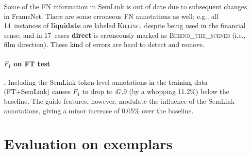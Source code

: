 \documentclass[a4paper,11pt,titlepage]{article}
\newcommand{\fnf}[1]{\textsc{\textsf{#1}}} %
\newcommand{\vpred}[1]{\textbf{#1}} %
\begin{document}
Some of the FN information in SemLink is out of date due to subsequent changes in FrameNet.
There are some erroneous FN annotations as well: e.g., all 14~instances of \vpred{liquidate} are
labeled \fnf{Killing}, despite being used in the financial sense; and in 17~cases \vpred{direct}
is erroneously marked as \fnf{Behind\_the\_scenes} (i.e., film direction).
These kind of errors are hard to detect and remove.

\paragraph{$F_1$ on FT test}. Including the SemLink token-level annotations in the training data (FT+SemLink)
causes $F_1$ to drop to 47.9 (by a whopping 11.2\%) below the baseline. 
The guide features, however, modulate the influence of the SemLink annotations, 
giving a minor increase of 0.05\% over the baseline.


\section{Evaluation on exemplars}


\setlength{\bibsep}{1pt}
{\fontsize{10}{12.25}\selectfont
}
\end{document}
